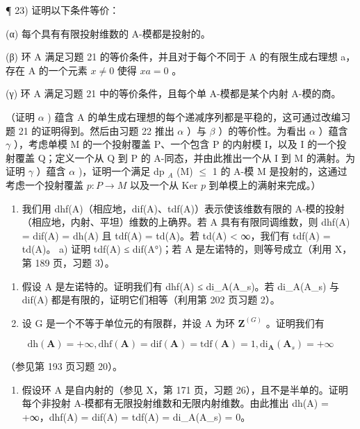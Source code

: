 ¶ 23) 证明以下条件等价：

(α) 每个具有有限投射维数的 A-模都是投射的。

(β) 环 A 满足习题 21 的等价条件，并且对于每个不同于 A 的有限生成右理想 a，存在 A 的一个元素 \(x \neq 0\) 使得 \(xa = 0\) 。

(γ) 环 A 满足习题 21 中的等价条件，且每个单 A-模都是某个内射 A-模的商。

（证明 \(\alpha\) ) 蕴含 A 的单生成右理想的每个递减序列都是平稳的，这可通过改编习题 21 的证明得到。然后由习题 22 推出 \(\alpha\) ）与 \(\beta\) ）的等价性。为看出 \(\alpha\) ）蕴含 \(\gamma\) ），考虑单模 M 的一个投射覆盖 P、一个包含 P 的内射模 I，以及 I 的一个投射覆盖 Q；定义一个从 Q 到 P 的 A-同态，并由此推出一个从 I 到 M 的满射。为证明 \(\gamma\) ）蕴含 \(\alpha\) )，证明一个满足 dp \(_{A}\) (M) \(\leqslant\) 1 的 A-模 M 是投射的，这通过考虑一个投射覆盖 \(p: P \to M\) 以及一个从 Ker \(p\) 到单模上的满射来完成。）

\begin{enumerate}
\def\labelenumi{\arabic{enumi})}
\setcounter{enumi}{23}
\tightlist
\item
  我们用 dhf(A)（相应地，dif(A)、tdf(A)）表示使该维数有限的 A-模的投射（相应地，内射、平坦）维数的上确界。若 A 具有有限同调维数，则 dhf(A) = dif(A) = dh(A) 且 tdf(A) = td(A)。若 td(A) \textless{} ∞，我们有 tdf(A) = td(A)。 a) 证明 tdf(A) ≤ dif(A°)；若 A 是左诺特的，则等号成立（利用 X，第 189 页，习题 3）。
\end{enumerate}

\begin{enumerate}
\def\labelenumi{\alph{enumi})}
\setcounter{enumi}{1}
\item
  假设 A 是左诺特的。证明我们有 dhf(A) ≤ di\_A(A\_s)。若 di\_A(A\_s) 与 dif(A) 都是有限的，证明它们相等（利用第 202 页习题 2）。
\item
  设 G 是一个不等于单位元的有限群，并设 A 为环 \(\mathbf{Z}^{(G)}\) 。证明我们有
\end{enumerate}

\[
\mathrm{dh} (\mathbf {A}) = + \infty , \mathrm{dhf} (\mathbf {A}) = \mathrm{dif} (\mathbf {A}) = \mathrm{tdf} (\mathbf {A}) = 1, \mathrm{di} _ {\mathbf {A}} (\mathbf {A} _ {s}) = + \infty
\]

（参见第 193 页习题 20）。

\begin{enumerate}
\def\labelenumi{\alph{enumi})}
\setcounter{enumi}{3}
\tightlist
\item
  假设环 A 是自内射的（参见 X，第 171 页，习题 26），且不是半单的。证明每个非投射 A-模都有无限投射维数和无限内射维数。由此推出 dh(A) = +∞，dhf(A) = dif(A) = tdf(A) = di\_A(A\_s) = 0。
\end{enumerate}

